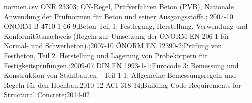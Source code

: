 \begin{filecontents*}{normen.csv}
	ONR 23303; ON-Regel, Prüfverfahren Beton (PVB), Nationale Anwendung der Prüfnormen für Beton und seiner Ausgangsstoffe.; 2007-10
	ÖNORM B 4710-1-66-9;Beton Teil 1: Festlegung, Herstellung, Verwendung und Konformitätsnachweis (Regeln zur Umsetzung der ÖNORM EN 206-1 für Normal- und Schwerbeton).;2007-10	
	ÖNORM EN 12390-2;Prüfung von Festbeton, Teil 2. Herstellung und Lagerung von Probekörpern für Festigkeitsprüfungen.;2009-07
	DIN EN 1993-1-1;Eurocode 3: Bemessung und Konstruktion von Stahlbauten -  Teil 1-1: Allgemeine Bemessungsregeln und Regeln für den Hochbau;2010-12
	ACI 318-14;Building Code Requirements for Structural Concrete;2014-02
\end{filecontents*}
\normenverzeichnis